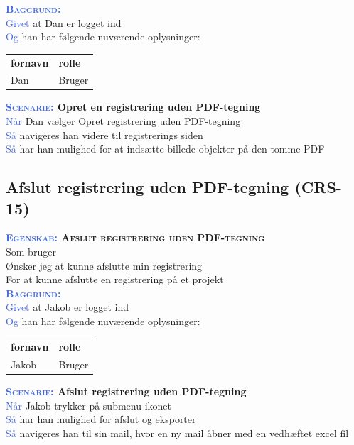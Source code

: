 \textsc{\textcolor{RoyalBlue}{\textbf{Baggrund:}}}\\
\textcolor{RoyalBlue}{Givet} at Dan er logget ind\\
\textcolor{RoyalBlue}{Og} han har følgende nuværende oplysninger:\\
\begin{tabular}{| l | l |}
	\textbf{fornavn} & \textbf{rolle} \\
	Dan & Bruger\\
\end{tabular}
\newline

\textbf{\textsc{\textcolor{RoyalBlue}{Scenarie:}} Opret en registrering uden PDF-tegning}\\
\textcolor{RoyalBlue}{Når} Dan vælger Opret registrering uden PDF-tegning\\
\textcolor{RoyalBlue}{Så} navigeres han videre til registrerings siden\\
\textcolor{RoyalBlue}{Så} har han mulighed for at indsætte billede objekter på den tomme PDF\\

\clearpage

\subsection{Afslut registrering uden PDF-tegning (CRS-15)} \label{sec:USAfslutRegUdenPDF}
\textbf{\textsc{\textcolor{RoyalBlue}{Egenskab:} Afslut registrering uden PDF-tegning}}\\
Som bruger\\
Ønsker jeg at kunne afslutte min registrering\\
For at kunne afslutte en registrering på et projekt\\

\textsc{\textcolor{RoyalBlue}{\textbf{Baggrund:}}}\\
\textcolor{RoyalBlue}{Givet} at Jakob er logget ind\\
\textcolor{RoyalBlue}{Og} han har følgende nuværende oplysninger:\\
\begin{tabular}{| l | l |}
	\textbf{fornavn} & \textbf{rolle} \\
	Jakob & Bruger\\
\end{tabular}

\textbf{\textsc{\textcolor{RoyalBlue}{Scenarie:}} Afslut registrering uden PDF-tegning}\\
\textcolor{RoyalBlue}{Når} Jakob trykker på submenu ikonet\\
\textcolor{RoyalBlue}{Så}  har han mulighed for afslut og eksporter\\
\textcolor{RoyalBlue}{Så}  navigeres han til sin mail, hvor en ny mail åbner med en vedhæftet excel fil\\


